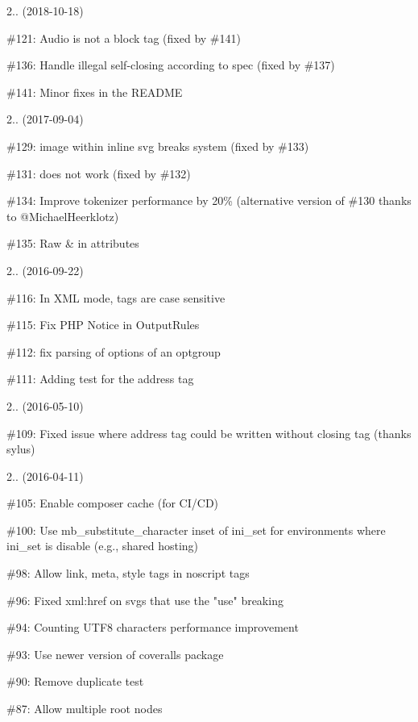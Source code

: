2.. (2018-\/10-\/18)


\begin{DoxyItemize}
\item \#121\+: Audio is not a block tag (fixed by \#141)
\item \#136\+: Handle illegal self-\/closing according to spec (fixed by \#137)
\item \#141\+: Minor fixes in the README
\end{DoxyItemize}

2.. (2017-\/09-\/04)


\begin{DoxyItemize}
\item \#129\+: image within inline svg breaks system (fixed by \#133)
\item \#131\+: \texttwosuperior{} does not work (fixed by \#132)
\item \#134\+: Improve tokenizer performance by 20\% (alternative version of \#130 thanks to @\+Michael\+Heerklotz)
\item \#135\+: Raw \& in attributes
\end{DoxyItemize}

2.. (2016-\/09-\/22)


\begin{DoxyItemize}
\item \#116\+: In XML mode, tags are case sensitive
\item \#115\+: Fix PHP Notice in Output\+Rules
\item \#112\+: fix parsing of options of an optgroup
\item \#111\+: Adding test for the address tag
\end{DoxyItemize}

2.. (2016-\/05-\/10)


\begin{DoxyItemize}
\item \#109\+: Fixed issue where address tag could be written without closing tag (thanks sylus)
\end{DoxyItemize}

2.. (2016-\/04-\/11)


\begin{DoxyItemize}
\item \#105\+: Enable composer cache (for CI/\+CD)
\item \#100\+: Use mb\+\_\+substitute\+\_\+character inset of ini\+\_\+set for environments where ini\+\_\+set is disable (e.\+g., shared hosting)
\item \#98\+: Allow link, meta, style tags in noscript tags
\item \#96\+: Fixed xml\+:href on svgs that use the "{}use"{} breaking
\item \#94\+: Counting UTF8 characters performance improvement
\item \#93\+: Use newer version of coveralls package
\item \#90\+: Remove duplicate test
\item \#87\+: Allow multiple root nodes
\end{DoxyItemize}

